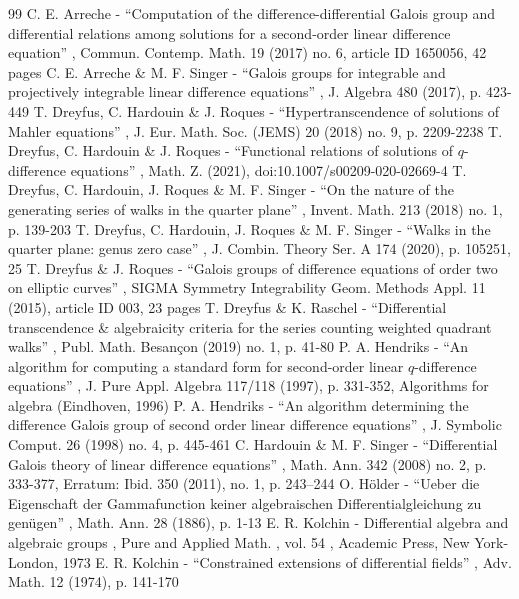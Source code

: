 \documentclass[10pt]{amsart}
\theoremstyle{definition}
\begin{document}
\begin{thebibliography}{99}
 C. E. Arreche - “Computation of the difference-differential Galois group and differential relations among solutions for a second-order linear difference equation” , Commun. Contemp. Math. 19 (2017) no. 6, article ID 1650056, 42 pages
 C. E. Arreche \& M. F. Singer - “Galois groups for integrable and projectively integrable linear difference equations” , J. Algebra 480 (2017), p. 423-449
 T. Dreyfus, C. Hardouin \& J. Roques - “Hypertranscendence of solutions of Mahler equations” , J. Eur. Math. Soc. (JEMS) 20 (2018) no. 9, p. 2209-2238
 T. Dreyfus, C. Hardouin \& J. Roques - “Functional relations of solutions of $ q $-difference equations” , Math. Z. (2021), doi:10.1007/s00209-020-02669-4
 T. Dreyfus, C. Hardouin, J. Roques \& M. F. Singer - “On the nature of the generating series of walks in the quarter plane” , Invent. Math. 213 (2018) no. 1, p. 139-203
 T. Dreyfus, C. Hardouin, J. Roques \& M. F. Singer - “Walks in the quarter plane: genus zero case” , J. Combin. Theory Ser. A 174 (2020), p. 105251, 25
 T. Dreyfus \& J. Roques - “Galois groups of difference equations of order two on elliptic curves” , SIGMA Symmetry Integrability Geom. Methods Appl. 11 (2015), article ID 003, 23 pages
 T. Dreyfus \& K. Raschel - “Differential transcendence \& algebraicity criteria for the series counting weighted quadrant walks” , Publ. Math. Besançon (2019) no. 1, p. 41-80
 P. A. Hendriks - “An algorithm for computing a standard form for second-order linear $q$-difference equations” , J. Pure Appl. Algebra 117/118 (1997), p. 331-352, Algorithms for algebra (Eindhoven, 1996)
 P. A. Hendriks - “An algorithm determining the difference Galois group of second order linear difference equations” , J. Symbolic Comput. 26 (1998) no. 4, p. 445-461
 C. Hardouin \& M. F. Singer - “Differential Galois theory of linear difference equations” , Math. Ann. 342 (2008) no. 2, p. 333-377, Erratum: Ibid. 350 (2011), no. 1, p. 243–244
 O. Hölder - “Ueber die Eigenschaft der Gammafunction keiner algebraischen Differentialgleichung zu genügen” , Math. Ann. 28 (1886), p. 1-13
 E. R. Kolchin - Differential algebra and algebraic groups , Pure and Applied Math. , vol. 54 , Academic Press, New York-London, 1973
 E. R. Kolchin - “Constrained extensions of differential fields” , Adv. Math. 12 (1974), p. 141-170

\end{thebibliography}
\end{document}
